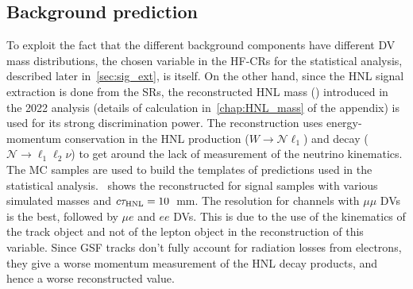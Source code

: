 \subsection{Background prediction}
To exploit the fact that the different background components have different DV mass distributions, the chosen variable  in the HF-CRs for the statistical analysis, described later in~\cref{sec:sig_ext}, is \mdv itself. On the other hand, since the HNL signal extraction is done from the SRs, the reconstructed HNL mass (\mhnl) introduced in the 2022 analysis (details of calculation in~\cref{chap:HNL_mass} of the appendix) is used for its strong discrimination power. The reconstruction uses energy-momentum conservation in the HNL production ($W\to\mathcal{N}\ell_1$) and decay ($\mathcal{N}\to\ell_1\ell_2\nu$) to get around the lack of measurement of the neutrino kinematics. The MC samples are used to build the templates of predictions used in the statistical analysis.~ shows the reconstructed \mhnl for signal samples with various simulated masses and $c\tau_\mathrm{HNL} = 10$~mm. The \mhnl resolution for channels with $\mu\mu$ DVs is the best, followed by $\mu e$ and $ee$ DVs. This is due to the use of the kinematics of the track object and not of the lepton object in the reconstruction of this variable. Since GSF tracks don't fully account for radiation losses from electrons, they give a worse momentum measurement of the HNL decay products, and hence a worse reconstructed \mhnl value.


